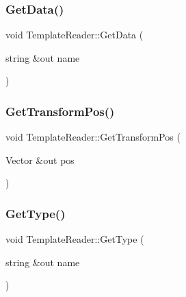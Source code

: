 \hypertarget{class_template_reader_a6707e50f2d652ad8a71bcb1792fe0bbb}{}\label{class_template_reader_a6707e50f2d652ad8a71bcb1792fe0bbb} 
\subsubsection{\texorpdfstring{Get\+Data()}{GetData()}}
{\footnotesize\ttfamily void Template\+Reader\+::\+Get\+Data (\begin{DoxyParamCaption}\item[{string \&out}]{name }\end{DoxyParamCaption})}

\hypertarget{class_template_reader_a0d1c978ffb2e5daffd32a2707e1c1bd9}{}\label{class_template_reader_a0d1c978ffb2e5daffd32a2707e1c1bd9} 
\subsubsection{\texorpdfstring{Get\+Transform\+Pos()}{GetTransformPos()}}
{\footnotesize\ttfamily void Template\+Reader\+::\+Get\+Transform\+Pos (\begin{DoxyParamCaption}\item[{Vector \&out}]{pos }\end{DoxyParamCaption})}

\hypertarget{class_template_reader_a90a40fb675f5e3a27f0d937451b4d96d}{}\label{class_template_reader_a90a40fb675f5e3a27f0d937451b4d96d} 
\subsubsection{\texorpdfstring{Get\+Type()}{GetType()}}
{\footnotesize\ttfamily void Template\+Reader\+::\+Get\+Type (\begin{DoxyParamCaption}\item[{string \&out}]{name }\end{DoxyParamCaption})}

\hypertarget{class_template_reader_a39be7ab479352a578a1bb9d99dfbaf53}{}\label{class_template_reader_a39be7ab479352a578a1bb9d99dfbaf53} 
